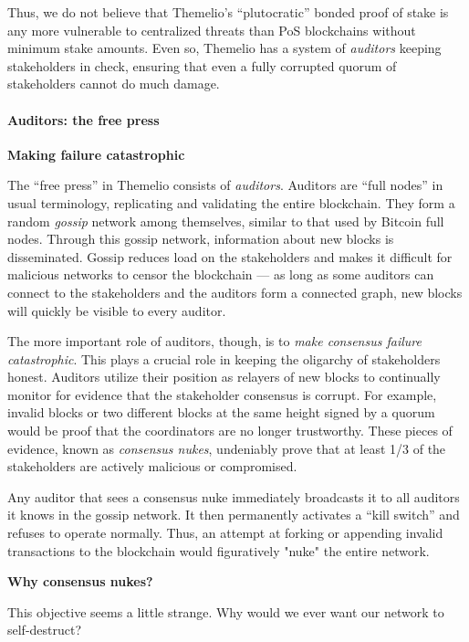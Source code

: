 \documentclass[]{article}
\let\oldparagraph\paragraph
\renewcommand{\paragraph}[1]{\oldparagraph{#1}\mbox{}}
\begin{document}
Thus, we do not believe that Themelio's ``plutocratic'' bonded proof of
stake is any more vulnerable to centralized threats than PoS blockchains
without minimum stake amounts. Even so, Themelio has a system of
\emph{auditors} keeping stakeholders in check, ensuring that even a
fully corrupted quorum of stakeholders cannot do much damage.

\hypertarget{auditors-the-free-press}{%
\paragraph{Auditors: the free press}\label{auditors-the-free-press}}

\textbf{Making failure catastrophic}

The ``free press'' in Themelio consists of \emph{auditors}. Auditors are
``full nodes'' in usual terminology, replicating and validating the
entire blockchain. They form a random \emph{gossip} network among
themselves, similar to that used by Bitcoin full nodes. Through this
gossip network, information about new blocks is disseminated. Gossip
reduces load on the stakeholders and makes it difficult for malicious
networks to censor the blockchain --- as long as some auditors can
connect to the stakeholders and the auditors form a connected graph, new
blocks will quickly be visible to every auditor.

The more important role of auditors, though, is to \emph{make consensus
failure catastrophic}. This plays a crucial role in keeping the
oligarchy of stakeholders honest. Auditors utilize their position as
relayers of new blocks to continually monitor for evidence that the
stakeholder consensus is corrupt. For example, invalid blocks or two
different blocks at the same height signed by a quorum would be proof
that the coordinators are no longer trustworthy. These pieces of
evidence, known as \emph{consensus nukes}, undeniably prove that at
least 1/3 of the stakeholders are actively malicious or compromised.

Any auditor that sees a consensus nuke immediately broadcasts it to all
auditors it knows in the gossip network. It then permanently activates a
``kill switch'' and refuses to operate normally. Thus, an attempt at
forking or appending invalid transactions to the blockchain would
figuratively "nuke" the entire network.

\textbf{Why consensus nukes?}

This objective seems a little strange. Why would we ever want our
network to self-destruct?
\end{document}
